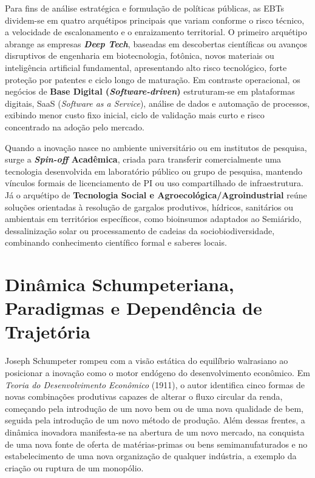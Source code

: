 \begin{boxConceito}
Para fins de análise estratégica e formulação de políticas públicas, as EBTs dividem-se em quatro arquétipos principais que variam conforme o risco técnico, a velocidade de escalonamento e o enraizamento territorial. O primeiro arquétipo abrange as empresas \textbf{\textit{Deep Tech}}, baseadas em descobertas científicas ou avanços disruptivos de engenharia em biotecnologia, fotônica, novos materiais ou inteligência artificial fundamental, apresentando alto risco tecnológico, forte proteção por patentes e ciclo longo de maturação. Em contraste operacional, os negócios de \textbf{Base Digital (\textit{Software-driven})} estruturam-se em plataformas digitais, SaaS (\textit{Software as a Service}), análise de dados e automação de processos, exibindo menor custo fixo inicial, ciclo de validação mais curto e risco concentrado na adoção pelo mercado.

Quando a inovação nasce no ambiente universitário ou em institutos de pesquisa, surge a \textbf{\textit{Spin-off} Acadêmica}, criada para transferir comercialmente uma tecnologia desenvolvida em laboratório público ou grupo de pesquisa, mantendo vínculos formais de licenciamento de PI ou uso compartilhado de infraestrutura. Já o arquétipo de \textbf{Tecnologia Social e Agroecológica/Agroindustrial} reúne soluções orientadas à resolução de gargalos produtivos, hídricos, sanitários ou ambientais em territórios específicos, como bioinsumos adaptados ao Semiárido, dessalinização solar ou processamento de cadeias da sociobiodiversidade, combinando conhecimento científico formal e saberes locais.
\end{boxConceito}

\section{Dinâmica Schumpeteriana, Paradigmas e Dependência de Trajetória}

Joseph Schumpeter rompeu com a visão estática do equilíbrio walrasiano ao posicionar a inovação como o motor endógeno do desenvolvimento econômico. Em \textit{Teoria do Desenvolvimento Econômico} (1911), o autor identifica cinco formas de novas combinações produtivas capazes de alterar o fluxo circular da renda, começando pela introdução de um novo bem ou de uma nova qualidade de bem, seguida pela introdução de um novo método de produção. Além dessas frentes, a dinâmica inovadora manifesta-se na abertura de um novo mercado, na conquista de uma nova fonte de oferta de matérias-primas ou bens semimanufaturados e no estabelecimento de uma nova organização de qualquer indústria, a exemplo da criação ou ruptura de um monopólio.

